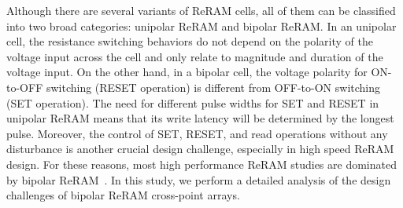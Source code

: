 Although there are several variants of ReRAM cells, all of them can be
classified into two broad categories: unipolar ReRAM and bipolar ReRAM. In
an unipolar cell, the resistance switching behaviors do not depend on the
polarity of the voltage input across the cell and only relate to magnitude
and duration of the voltage input. On the other hand, in a bipolar cell,
the voltage polarity for ON-to-OFF switching (RESET operation) is
different from OFF-to-ON switching (SET operation).
The need for different pulse widths for SET and RESET in unipolar ReRAM
means that its write latency will be determined by the longest pulse.
Moreover, the control of SET, RESET, and read operations without any
disturbance is another crucial design challenge, especially in high speed
ReRAM design. For these reasons, most high performance ReRAM studies are
dominated by bipolar
ReRAM~\cite{ReRAM_IEDM2010_Kim,ReRAM_ISSCC2011_Sheu,ReRAM_ISSCC2011_Otsuka}.
In this study, we perform a detailed analysis of the design challenges of bipolar ReRAM cross-point arrays.

